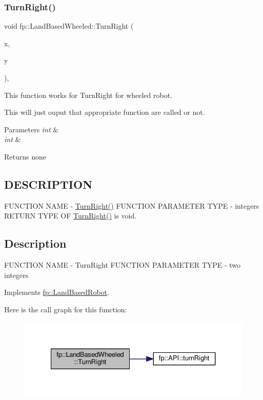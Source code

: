 \subsubsection{\texorpdfstring{Turn\+Right()}{TurnRight()}}
{\footnotesize\ttfamily void fp\+::\+Land\+Based\+Wheeled\+::\+Turn\+Right (\begin{DoxyParamCaption}\item[{int}]{x,  }\item[{int}]{y }\end{DoxyParamCaption})\hspace{0.3cm}{\ttfamily [override]}, {\ttfamily [virtual]}}



This function works for Turn\+Right for wheeled robot. 

This will just ouput that appropriate function are called or not.


\begin{DoxyParams}{Parameters}
{\em int} & \\
\hline
{\em int} & \\
\hline
\end{DoxyParams}
\begin{DoxyReturn}{Returns}
none 
\end{DoxyReturn}
\hypertarget{_m_a_z_e_8h_DESCRIPTION}{}\subsection{D\+E\+S\+C\+R\+I\+P\+T\+I\+ON}\label{_m_a_z_e_8h_DESCRIPTION}
F\+U\+N\+C\+T\+I\+ON N\+A\+ME -\/ \hyperlink{classfp_1_1_land_based_wheeled_ac6e93b00e624e281a497e99729db04e7}{Turn\+Right()} F\+U\+N\+C\+T\+I\+ON P\+A\+R\+A\+M\+E\+T\+ER T\+Y\+PE -\/ integers R\+E\+T\+U\+RN T\+Y\+PE OF \hyperlink{classfp_1_1_land_based_wheeled_ac6e93b00e624e281a497e99729db04e7}{Turn\+Right()} is void.\hypertarget{main_8cpp_Description}{}\subsection{Description}\label{main_8cpp_Description}
F\+U\+N\+C\+T\+I\+ON N\+A\+ME -\/ Turn\+Right F\+U\+N\+C\+T\+I\+ON P\+A\+R\+A\+M\+E\+T\+ER T\+Y\+PE -\/ two integers 

Implements \hyperlink{classfp_1_1_land_based_robot_a7360e4084bc5254f72ab0d3612644907}{fp\+::\+Land\+Based\+Robot}.

Here is the call graph for this function\+:
\nopagebreak
\begin{figure}[H]
\begin{center}
\leavevmode
\includegraphics[width=327pt]{classfp_1_1_land_based_wheeled_ac6e93b00e624e281a497e99729db04e7_cgraph}
\end{center}
\end{figure}


